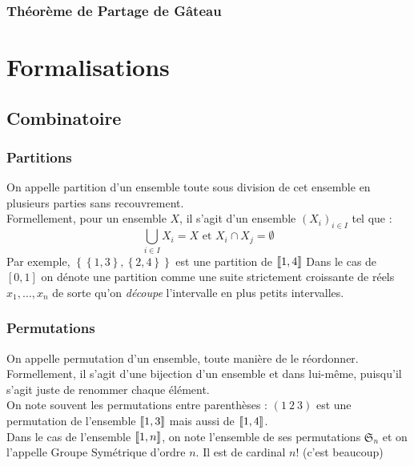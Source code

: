 \documentclass{beamercours}
\begin{document}
\begin{frame}
    \frametitle{Théorème de Partage de Gâteau}
\end{frame}

\section{Formalisations}
\subsection{Combinatoire}
\begin{frame}
    \frametitle{Partitions}
     {On appelle partition d'un ensemble toute sous division de cet ensemble en plusieurs parties sans recouvrement.\\}
     {Formellement, pour un ensemble $X$, il s'agit d'un ensemble $(X_{i})_{i\in I}$ tel que : 
    \[
        \bigcup_{i\in I}X_{i} = X \text{ et } X_{i} \cap X_{j} = \emptyset
    \]}
     {Par exemple, $\left\{\left\{1, 3\right\}, \left\{2, 4\right\}\right\}$ est une partition de $\left\llbracket 1, 4\right\rrbracket$}
     {Dans le cas de $\left[0, 1\right]$ on dénote une partition comme une suite strictement croissante de réels $x_{1}, \ldots, x_{n}$ de sorte qu'on \textit{découpe} l'intervalle en plus petits intervalles.}
\end{frame}

\begin{frame}
    \frametitle{Permutations}
     {On appelle permutation d'un ensemble, toute manière de le réordonner.\\}
     {Formellement, il s'agit d'une bijection d'un ensemble et dans lui-même, puisqu'il s'agit juste de renommer chaque élément.\\}
     {On note souvent les permutations entre parenthèses : $\left(1 \ 2 \ 3\right)$ est une permutation de l'ensemble $\left\llbracket 1, 3\right\rrbracket$ mais aussi de $\left\llbracket 1, 4\right\rrbracket$.\\}
     {Dans le cas de l'ensemble $\left\llbracket 1, n\right\rrbracket$, on note l'ensemble de ses permutations $\mathfrak{S}_{n}$ et on l'appelle Groupe Symétrique d'ordre $n$. Il est de cardinal $n!$ (c'est beaucoup)}
\end{frame}
\end{document}
